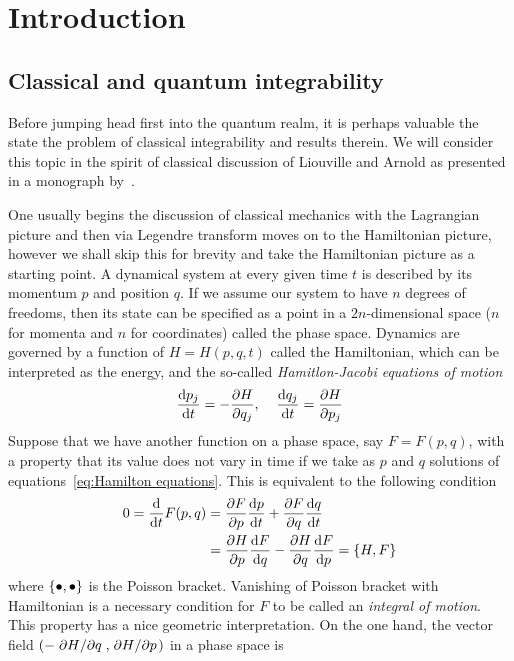 \chapter{Introduction}
\thispagestyle{chapterBeginStyle}


\section{Classical and quantum integrability}

Before jumping head first into the quantum realm, it is perhaps valuable the state
the problem of classical integrability and results therein.
We will consider this topic in the spirit of classical discussion
of Liouville and Arnold as presented in a monograph by~\textcite{Gutzwiller1991}.

One usually begins the discussion of classical mechanics with the Lagrangian picture and then
via Legendre transform moves on to the Hamiltonian picture, however we shall skip this
for brevity and take the Hamiltonian picture as a starting point.
A dynamical system at every given time \(t\) is described by its momentum \(p\) and
position \(q\). If we assume our system to have \(n\) degrees of freedoms, then
its state can be specified as a point in a \(2n\)-dimensional space (\(n\) for momenta and
\(n\) for coordinates) called the phase space. Dynamics are governed by a function
of \(H = H(p,q,t)\) called the Hamiltonian, which can be interpreted as the energy,
and the so-called \textit{Hamitlon-Jacobi equations of motion}
\begin{equation}
    \dv{p_j}{t} = -\pdv{H}{q_j},\;\;\;\; \dv{q_j}{t} = \pdv{H}{p_j}
    \label{eq:Hamilton equations}
\end{equation} 
Suppose that we have another function on a phase space, say \(F=F(p,q)\), with
a property that its value does not vary in time if we take as \(p\) and \(q\) solutions
of equations~\eqref{eq:Hamilton equations}. This is equivalent to the following condition
\begin{align}
    0 = \dv{}{t}F(p,q) &= \pdv{F}{p} \dv{p}{t} + \pdv{F}{q}\dv{q}{t} \nonumber\\
    &= \pdv{H}{p}\dv{F}{q} - \pdv{H}{q}\dv{F}{p} = \poissonbracket{H}{F}
\end{align}
where \(\poissonbracket{\bullet }{\bullet }\) is the Poisson bracket.
Vanishing of Poisson bracket with Hamiltonian is a necessary condition for \(F\)
to be called an \textit{integral of motion}. This property has a nice geometric interpretation.
On the one hand, the vector field \(\left(-\pdv*{H}{q},\pdv*{H}{p}\right)\) in a phase space is
